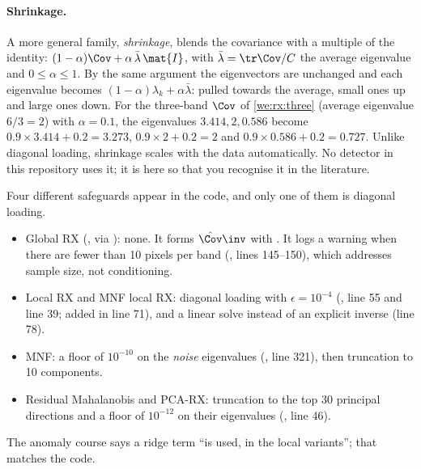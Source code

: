 \paragraph{Shrinkage.} A more general family, \emph{shrinkage}, blends the
covariance with a multiple of the identity:
$(1 - \alpha)\Cov + \alpha\,\bar\lambda\,\mat{I}$, with $\bar\lambda = \tr\Cov/C$ the average
eigenvalue and $0 \le \alpha \le 1$. By the same argument the eigenvectors are unchanged and each
eigenvalue becomes $(1 - \alpha)\lambda_k + \alpha\bar\lambda$: pulled towards the average, small ones
up and large ones down. For the three-band $\Cov$ of \cref{we:rx:three} (average eigenvalue
$6/3 = 2$) with $\alpha = 0.1$, the eigenvalues $3.414, 2, 0.586$ become
$0.9\times3.414 + 0.2 = 3.273$, $0.9\times2 + 0.2 = 2$ and $0.9\times0.586 + 0.2 = 0.727$. Unlike
diagonal loading, shrinkage scales with the data automatically. No detector in this repository uses
it; it is here so that you recognise it in the literature.

\begin{sourcenote}
Four different safeguards appear in the code, and only one of them is diagonal loading.
\begin{itemize}
  \item Global RX (, via ): none. It forms
    $\hat\Cov\inv$ with . It logs a warning when there are fewer than 10 pixels
    per band (, lines 145--150), which addresses sample size, not
    conditioning.
  \item Local RX and MNF local RX: diagonal loading with $\epsilon = 10^{-4}$
    (,  line 55 and
     line 39; added in
     line 71), and a linear solve instead of an explicit
    inverse (line 78).
  \item MNF: a floor of $10^{-10}$ on the \emph{noise} eigenvalues
    (, line 321), then truncation to 10 components.
  \item Residual Mahalanobis and PCA-RX: truncation to the top 30 principal directions and a floor of
    $10^{-12}$ on their eigenvalues (, line 46).
\end{itemize}
The anomaly course says a ridge term ``is used, in the local variants''; that matches the code.
\end{sourcenote}

